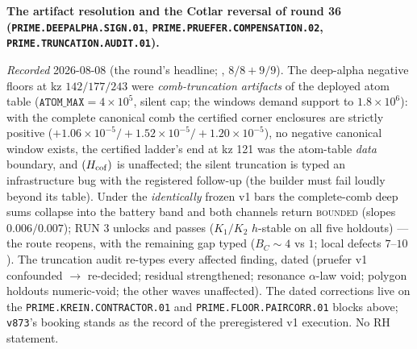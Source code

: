 \par\smallskip\noindent\textbf{The artifact resolution and the
Cotlar reversal of round 36
(\texttt{PRIME.DEEPALPHA.SIGN.01},
\texttt{PRIME.PRUEFER.\allowbreak COMPENSATION.02},
\texttt{PRIME.TRUNCATION.\allowbreak AUDIT.01}).}
{\sloppy
\emph{Recorded} 2026-08-08 (the round's headline;
, $8/8 + 9/9$).  The
deep-alpha negative floors at kz $142/177/243$ were
\emph{comb-truncation artifacts} of the deployed atom table
($\texttt{ATOM\_MAX} = 4\times10^{5}$, silent cap;
the windows demand support to $1.8\times10^{6}$): with the
complete canonical comb the certified corner enclosures are
strictly positive
($+1.06\times10^{-5}/+1.52\times10^{-5}/+1.20\times10^{-5}$),
no negative canonical window exists, the certified ladder's end
at kz 121 was the atom-table \emph{data} boundary, and
$(H_{\rm cof})$ is unaffected; the silent truncation is typed
an infrastructure bug with the registered follow-up (the
builder must fail loudly beyond its table).  Under the
\emph{identically} frozen v1 bars the complete-comb deep sums
collapse into the battery band and both channels return
\textsc{bounded} (slopes $0.006/0.007$); RUN 3 unlocks and
passes ($K_1/K_2$ $h$-stable on all five holdouts) --- the
route reopens, with the remaining gap typed ($B_C \sim 4$ vs
$1$; local defects $7$--$10$).  The truncation audit re-types
every affected finding, dated (pruefer v1 confounded $\to$
re-decided; residual strengthened; resonance $\alpha$-law void;
polygon holdouts numeric-void; the other waves unaffected).
The dated corrections live on the
\texttt{PRIME.KREIN.CONTRACTOR.01} and
\texttt{PRIME.FLOOR.PAIRCORR.01} blocks above; \texttt{v873}'s
booking stands as the record of the preregistered v1
execution.  No RH statement.\par}


